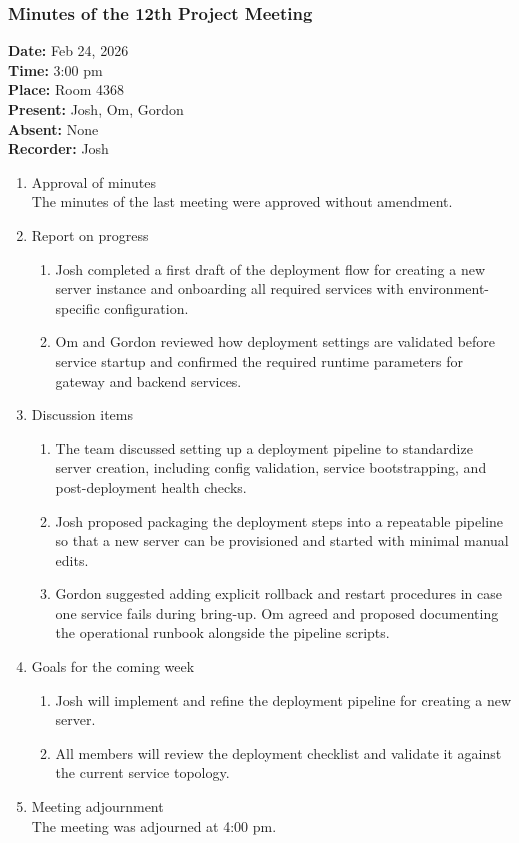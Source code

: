 \documentclass[12pt,a4paper]{article}
\begin{document}
\subsubsection{Minutes of the 12th Project Meeting}
\textbf{Date:} Feb 24, 2026\\
\textbf{Time:} 3:00 pm\\
\textbf{Place:} Room 4368\\
\textbf{Present:} Josh, Om, Gordon\\
\textbf{Absent:} None\\
\textbf{Recorder:} Josh

\begin{enumerate}
\item Approval of minutes\\
The minutes of the last meeting were approved without amendment.\\
\item Report on progress
\begin{enumerate}
\item Josh completed a first draft of the deployment flow for creating a new server instance and onboarding all required services with environment-specific configuration.\\
\item Om and Gordon reviewed how deployment settings are validated before service startup and confirmed the required runtime parameters for gateway and backend services.\\
\end{enumerate}
\item Discussion items
\begin{enumerate}
\item The team discussed setting up a deployment pipeline to standardize server creation, including config validation, service bootstrapping, and post-deployment health checks.\\
\item Josh proposed packaging the deployment steps into a repeatable pipeline so that a new server can be provisioned and started with minimal manual edits.\\
\item Gordon suggested adding explicit rollback and restart procedures in case one service fails during bring-up. Om agreed and proposed documenting the operational runbook alongside the pipeline scripts.\\
\end{enumerate}
\item Goals for the coming week
\begin{enumerate}
\item Josh will implement and refine the deployment pipeline for creating a new server.\\
\item All members will review the deployment checklist and validate it against the current service topology.\\
\end{enumerate}
\item Meeting adjournment\\
The meeting was adjourned at 4:00 pm.
\end{enumerate}
\end{document}
